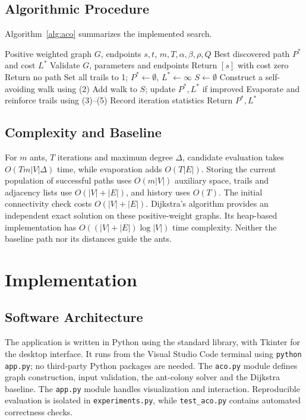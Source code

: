 \documentclass[conference]{IEEEtran}
\begin{document}
\subsection{Algorithmic Procedure}
Algorithm~\ref{alg:aco} summarizes the implemented search.
\begin{algorithm}[tb]
\caption{ACO shortest-path search}\label{alg:aco}
\begin{algorithmic}[1]
\REQUIRE Positive weighted graph $G$, endpoints $s,t$, $m,T,\alpha,\beta,\rho,Q$
\ENSURE Best discovered path $P^*$ and cost $L^*$
\STATE Validate $G$, parameters and endpoints
\STATE Return $[s]$ with cost zero
\ENDIF
{}
\STATE Return no path
\ENDIF
\STATE Set all trails to 1; $P^*\gets\emptyset$, $L^*\gets\infty$
\STATE $S\gets\emptyset$
\STATE Construct a self-avoiding walk using (2)
\STATE Add walk to $S$; update $P^*,L^*$ if improved
\ENDIF
\ENDFOR
\STATE Evaporate and reinforce trails using (3)--(5)
\STATE Record iteration statistics
\ENDFOR
\STATE Return $P^*,L^*$
\end{algorithmic}
\end{algorithm}

\subsection{Complexity and Baseline}
For $m$ ants, $T$ iterations and maximum degree $\Delta$, candidate evaluation takes $O(Tm|V|\Delta)$ time, while evaporation adds $O(T|E|)$. Storing the current population of successful paths uses $O(m|V|)$ auxiliary space, trails and adjacency lists use $O(|V|+|E|)$, and history uses $O(T)$. The initial connectivity check costs $O(|V|+|E|)$. Dijkstra's algorithm \cite{dijkstra1959added} provides an independent exact solution on these positive-weight graphs. Its heap-based implementation has $O((|V|+|E|)\log |V|)$ time complexity. Neither the baseline path nor its distances guide the ants.

\section{Implementation}
\subsection{Software Architecture}
The application is written in Python using the standard library, with Tkinter for the desktop interface. It runs from the Visual Studio Code terminal using \texttt{python app.py}; no third-party Python packages are needed. The \texttt{aco.py} module defines graph construction, input validation, the ant-colony solver and the Dijkstra baseline. The \texttt{app.py} module handles visualization and interaction. Reproducible evaluation is isolated in \texttt{experiments.py}, while \texttt{test\_aco.py} contains automated correctness checks.
\end{document}
